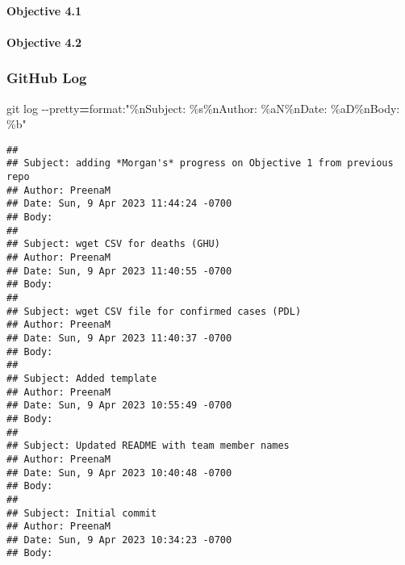 \documentclass[
]{article}
\newenvironment{Shaded}{\begin{snugshade}}{\end{snugshade}}
\newcommand{\AttributeTok}[1]{\textcolor[rgb]{0.77,0.63,0.00}{#1}}
\newcommand{\FunctionTok}[1]{\textcolor[rgb]{0.00,0.00,0.00}{#1}}
\newcommand{\NormalTok}[1]{#1}
\newcommand{\OperatorTok}[1]{\textcolor[rgb]{0.81,0.36,0.00}{\textbf{#1}}}
\newcommand{\StringTok}[1]{\textcolor[rgb]{0.31,0.60,0.02}{#1}}
\begin{document}
\hypertarget{objective-4.1}{%
\paragraph{Objective 4.1}\label{objective-4.1}}

\hypertarget{objective-4.2}{%
\paragraph{Objective 4.2}\label{objective-4.2}}

\hypertarget{github-log}{%
\subsubsection{GitHub Log}\label{github-log}}

\begin{Shaded}
\begin{Highlighting}[]
\FunctionTok{git}\NormalTok{ log }\AttributeTok{{-}{-}pretty}\OperatorTok{=}\NormalTok{format:}\StringTok{"\%nSubject: \%s\%nAuthor: \%aN\%nDate: \%aD\%nBody: \%b"}
\end{Highlighting}
\end{Shaded}

\begin{verbatim}
## 
## Subject: adding *Morgan's* progress on Objective 1 from previous repo
## Author: PreenaM
## Date: Sun, 9 Apr 2023 11:44:24 -0700
## Body: 
## 
## Subject: wget CSV for deaths (GHU)
## Author: PreenaM
## Date: Sun, 9 Apr 2023 11:40:55 -0700
## Body: 
## 
## Subject: wget CSV file for confirmed cases (PDL)
## Author: PreenaM
## Date: Sun, 9 Apr 2023 11:40:37 -0700
## Body: 
## 
## Subject: Added template
## Author: PreenaM
## Date: Sun, 9 Apr 2023 10:55:49 -0700
## Body: 
## 
## Subject: Updated README with team member names
## Author: PreenaM
## Date: Sun, 9 Apr 2023 10:40:48 -0700
## Body: 
## 
## Subject: Initial commit
## Author: PreenaM
## Date: Sun, 9 Apr 2023 10:34:23 -0700
## Body:
\end{verbatim}
\end{document}

